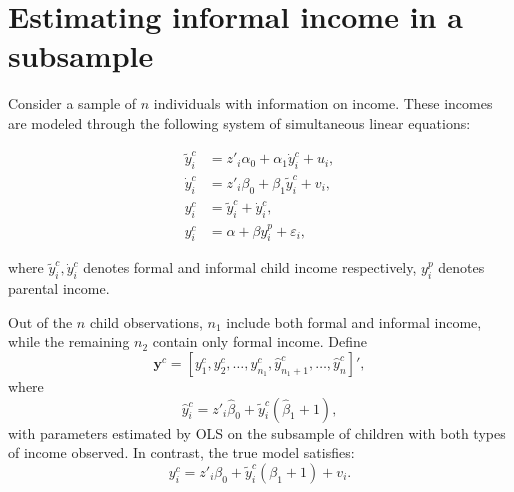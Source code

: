 \documentclass[12pt,oneside]{article}
\DeclareMathOperator*{\plim}{plim}
\theoremstyle{bracket}
\begin{document}
\begin{comment}
$$\operatorname{Cov}(\hat{y}_i^c,y_i^p)=\operatorname{Cov}(y_i^c,y_i^p)+(\plim \hat{\beta}_1^{OLS} - \beta_1)(\operatorname{Cov}(\tilde{y}_i^c,y_i^p)-\gamma_{\tilde{y}z})$$
Where $\gamma_{\tilde{y}z}=  (\mathrm{E}[z_iz'_i])^{-1}\mathrm{E}[z_i\tilde{y}_i^c]$.

Assuming that $\plim \bar{y}^p_{n_1}= \plim \bar{y}^p_{n_2} = \plim \bar{y}^p$ and $\plim \frac{n_1}{n} = p_1, \plim \frac{n_2}{n} = p_2$ we have:
$$\plim \hat{\rho}_{OLS} = \beta + p_2(\plim \hat{\beta}_1^{OLS} - \beta_1)(\operatorname{Cov}(\tilde{y}_i^c,y_i^p)-\gamma_{\tilde{y}z})$$
$$\plim \hat{\rho}_{OLS} = \beta + p_2(\plim \hat{\beta}_1^{OLS} - \beta_1)(\operatorname{Cov}(\tilde{y}_i^c,y_i^p)-\operatorname{Cov}(z_i,y_i^p)\gamma_{\tilde{y}z})$$

$$\plim \hat{\rho}_{OLS} = \beta + p_2((\plim \hat{\beta}_1^{OLS} - \beta_1)\operatorname{Cov}(\tilde{y}_i^c,y_i^p)-\operatorname{Cov}(z_i,y_i^p)(\plim \hat{\beta}_0^{OLS} - \beta_0))$$
\end{comment}

\section{Estimating informal income in a subsample}

Consider a sample of $n$ individuals with information on income. These incomes are modeled through the following system of simultaneous linear equations:

\begin{align}
    \tilde{y}^c_i &= z'_i \alpha_0 + \alpha_1 \dot{y}^c_i + u_i, \\
    \dot{y}^c_i &= z'_i \beta_0 + \beta_1 \tilde{y}^c_i + v_i, \\
    y^c_i &= \tilde{y}^c_i + \dot{y}^c_i, \\
    y^c_i &= \alpha + \beta y_i^p + \varepsilon_i,
\end{align}

where $\tilde{y}^c_i,\dot{y}^c_i$ denotes formal and informal child income respectively, $y_i^p$  denotes parental income.  

Out of the $n$ child observations, $n_1$ include both formal and informal income, while the remaining $n_2$ contain only formal income.
Define
\[
\mathbf{y}^c = [y_1^c, y_2^c, \ldots, y_{n_1}^c, \hat{y}_{n_1+1}^c, \ldots, \hat{y}_n^c]',
\]
where
\[
\hat{y}_i^c = z'_i \hat{\beta}_0 + \tilde{y}^c_i(\hat{\beta}_1+1),
\]
with parameters estimated by OLS on the subsample of children with both types of income observed.  
In contrast, the true model satisfies:
\[
y_i^c = z'_i \beta_0 + \tilde{y}_i^c(\beta_1+1) + v_i.
\]
\end{document}
